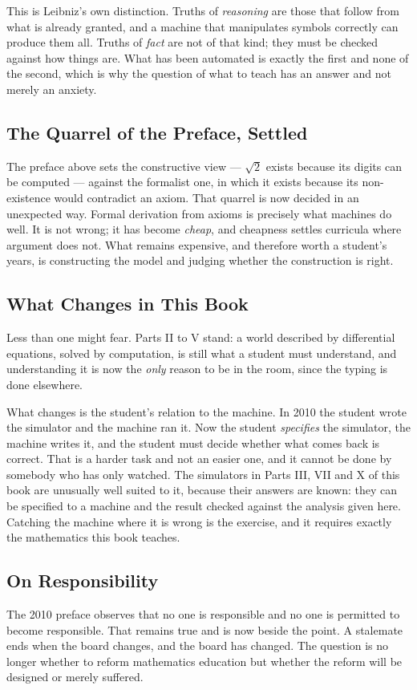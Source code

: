 This is Leibniz's own distinction. Truths of \emph{reasoning} are those that follow from what is
already granted, and a machine that manipulates symbols correctly can produce them all. Truths of
\emph{fact} are not of that kind; they must be checked against how things are. What has been
automated is exactly the first and none of the second, which is why the question of what to teach
has an answer and not merely an anxiety.

\subsection*{The Quarrel of the Preface, Settled}

The preface above sets the constructive view --- $\sqrt2$ exists because its digits can be computed
--- against the formalist one, in which it exists because its non-existence would contradict an
axiom. That quarrel is now decided in an unexpected way. Formal derivation from axioms is precisely
what machines do well. It is not wrong; it has become \emph{cheap}, and cheapness settles curricula
where argument does not. What remains expensive, and therefore worth a student's years, is
constructing the model and judging whether the construction is right.

\subsection*{What Changes in This Book}

Less than one might fear. Parts II to V stand: a world described by differential equations, solved
by computation, is still what a student must understand, and understanding it is now the \emph{only}
reason to be in the room, since the typing is done elsewhere.

What changes is the student's relation to the machine. In 2010 the student wrote the simulator and
the machine ran it. Now the student \emph{specifies} the simulator, the machine writes it, and the
student must decide whether what comes back is correct. That is a harder task and not an easier
one, and it cannot be done by somebody who has only watched. The simulators in Parts III, VII and X
of this book are unusually well suited to it, because their answers are known: they can be
specified to a machine and the result checked against the analysis given here. Catching the machine
where it is wrong is the exercise, and it requires exactly the mathematics this book teaches.

\subsection*{On Responsibility}

The 2010 preface observes that no one is responsible and no one is permitted to become responsible.
That remains true and is now beside the point. A stalemate ends when the board changes, and the
board has changed. The question is no longer whether to reform mathematics education but whether
the reform will be designed or merely suffered.
